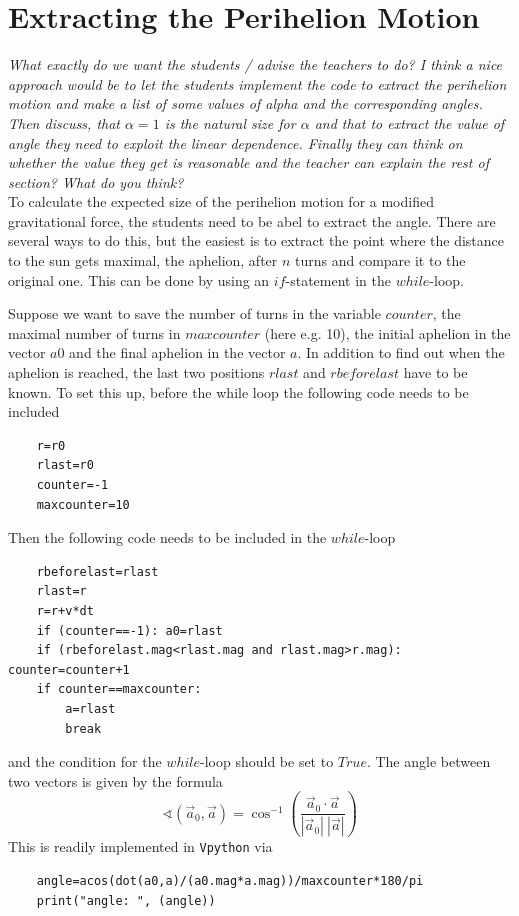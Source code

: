 \documentclass[12pt]{iopart}
\begin{document}
\section{Extracting the Perihelion Motion}

\textit{What exactly do we want the students / advise the teachers to do? I think a nice approach would be to let the students implement the code to extract the perihelion motion and make a list of some values of alpha and the corresponding angles. Then discuss, that $\alpha=1$ is the natural size for $\alpha$ and that to extract the value of angle they need to exploit the linear dependence. Finally they can think on whether the value they get is reasonable and the teacher can explain the rest of section? What do you think?}\\

To calculate the expected size of the perihelion motion for a modified gravitational force, the students need to be abel to extract the angle. There are several ways to do this, but the easiest is to extract the point where the distance to the sun gets maximal, the aphelion, after $n$ turns and compare it to the original one. This can be done by using an $if$-statement in the $while$-loop.

Suppose we want to save the number of turns in the variable $counter$, the maximal number of turns in $maxcounter$ (here e.g. 10), the initial aphelion in the vector $a0$ and the final aphelion in the vector $a$. In addition to find out when the aphelion is reached, the last two positions $rlast$ and $rbeforelast$ have to be known. To set this up, before the while loop the following code needs to be included
\begin{lstlisting}
	r=r0
	rlast=r0
	counter=-1
	maxcounter=10
\end{lstlisting}
Then the following code needs to be included in the $while$-loop
\begin{lstlisting}
    rbeforelast=rlast
    rlast=r
    r=r+v*dt
    if (counter==-1): a0=rlast
    if (rbeforelast.mag<rlast.mag and rlast.mag>r.mag): counter=counter+1
    if counter==maxcounter:
    	a=rlast
    	break
\end{lstlisting}
and the condition for the $while$-loop should be set to $True$.
The angle between two vectors is given by the formula
 \begin{equation}
 	\sphericalangle(\vec{a}_0,\vec{a}) = \cos^{-1} \left( \frac{\vec{a}_0 \cdot \vec{a}}{|\vec{a}_0|\:|\vec{a}|} \right)
 \end{equation}
This is readily implemented in \texttt{Vpython} via
\begin{lstlisting}
	angle=acos(dot(a0,a)/(a0.mag*a.mag))/maxcounter*180/pi
	print("angle: ", (angle))
\end{lstlisting}
\end{document}
